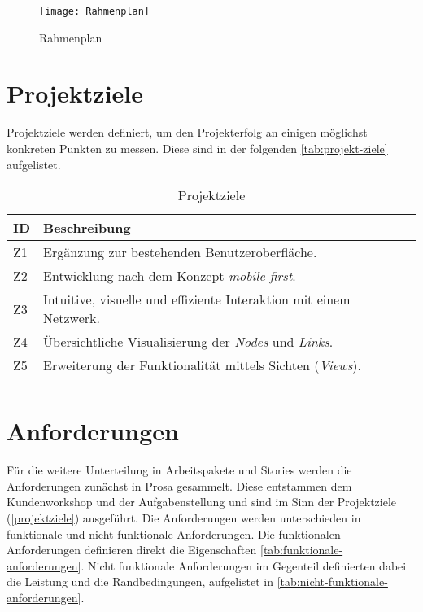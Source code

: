 
\newpage

\begin{landscape}
\begin{figure}[ht]
\centering
\texttt{[image: Rahmenplan]}
\caption{Rahmenplan}
\label{fig:rahmenplan}
\end{figure}
\end{landscape}

\newpage

\section{Projektziele} \label{projektziele}
Projektziele werden definiert, um den Projekterfolg an einigen möglichst konkreten Punkten zu messen. Diese sind in der folgenden \autoref{tab:projekt-ziele} aufgelistet.

\begin{longtable}{|p{1cm}  | p{10.5cm}|}
  \hline
    ID &  Beschreibung \\\hline
    Z1 & Ergänzung zur bestehenden Benutzeroberfläche.\\\hline
    Z2 & Entwicklung nach dem Konzept \textit{mobile first}.\\\hline
    Z3 & Intuitive, visuelle und effiziente Interaktion mit einem Netzwerk.\\\hline
    Z4 & Übersichtliche Visualisierung der \textit{Nodes} und \textit{Links}.\\\hline
    Z5 & Erweiterung der Funktionalität mittels Sichten (\textit{Views}).\\\hline
    \caption{Projektziele}
  \label{tab:projekt-ziele}
\end{longtable}

\section{Anforderungen} \label{anforderungen}

Für die weitere Unterteilung in Arbeitspakete und Stories werden die Anforderungen zunächst in Prosa gesammelt. Diese entstammen dem Kundenworkshop und der Aufgabenstellung und sind im Sinn der Projektziele (\autoref{projektziele}) ausgeführt. Die Anforderungen werden unterschieden in funktionale und nicht funktionale Anforderungen. Die funktionalen Anforderungen definieren direkt die Eigenschaften \autoref{tab:funktionale-anforderungen}. Nicht funktionale Anforderungen im Gegenteil definierten dabei die Leistung und die Randbedingungen, aufgelistet in \autoref{tab:nicht-funktionale-anforderungen}.

